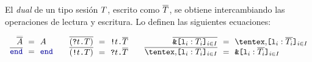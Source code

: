 El \emph{dual} de un tipo sesión $T$, escrito como
$\overline{T}$, se obtiene intercambiando las operaciones de lectura y
escritura. Lo definen las siguientes ecuaciones:

\[
\begin{array}{c}
  \begin{array}{@{}r@{~~}c@{~~}l@{}}
    \smash{\dual{\dual\etvar}} & = & \etvar \\
    \dual\End & = & \End \\
  \end{array}
  \qquad
  \begin{array}{@{}r@{~~}c@{~~}l@{}}
    \dual{(\In\Type\SessionType)} & = & \Out\Type\dual\SessionType \\
    \dual{(\Out\Type\SessionType)} & = & \In\Type\dual\SessionType \\
  \end{array}
  \qquad
  \begin{array}{@{}r@{~~}c@{~~}l@{}}
    \dual{\Branch \set[i\in I]{\Tag_i : \SessionType_i}}
    & = & \Choice \set[i\in I]{\Tag_i : \dual{\SessionType_i}} \\
    \dual{\Choice \set[i\in I]{\Tag_i : \SessionType_i}}
    & = & \Branch \set[i\in I]{\Tag_i : \dual{\SessionType_i}} \\
  \end{array}
\end{array}
\]
